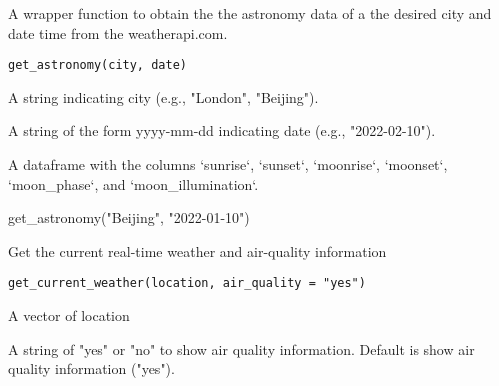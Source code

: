\documentclass[a4paper]{book}
\begin{document}
%
\begin{Description}\relax
A wrapper function to obtain the the astronomy data of a the desired city and date time from the weatherapi.com.
\end{Description}
%
\begin{Usage}
\begin{verbatim}
get_astronomy(city, date)
\end{verbatim}
\end{Usage}
%
\begin{Arguments}
\begin{ldescription}
\item[\code{city}] A string indicating city (e.g., "London", "Beijing").

\item[\code{date}] A string of the form yyyy-mm-dd indicating date (e.g., "2022-02-10").
\end{ldescription}
\end{Arguments}
%
\begin{Value}
A dataframe with the columns `sunrise`, `sunset`, `moonrise`, `moonset`, `moon\_phase`, and `moon\_illumination`.
\end{Value}
%
\begin{Examples}
\begin{ExampleCode}
get_astronomy("Beijing", "2022-01-10")
\end{ExampleCode}
\end{Examples}
%
\begin{Description}\relax
Get the current real-time weather and air-quality information
\end{Description}
%
\begin{Usage}
\begin{verbatim}
get_current_weather(location, air_quality = "yes")
\end{verbatim}
\end{Usage}
%
\begin{Arguments}
\begin{ldescription}
\item[\code{location}] A vector of location

\item[\code{air\_quality}] A string of "yes" or "no" to show air quality
information. Default is show air quality information ("yes").
\end{ldescription}
\end{Arguments}
\end{document}
